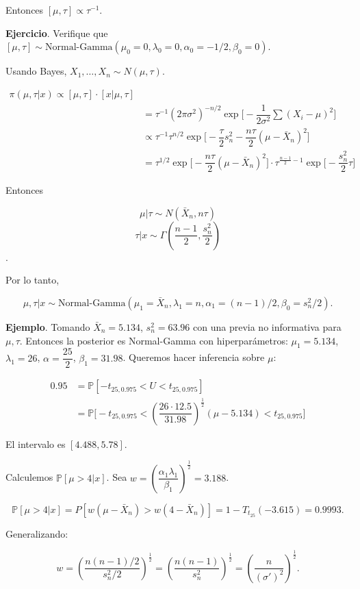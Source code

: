 \documentclass[
  12pt,
]{book}
\begin{document}
Entonces \([\mu,\tau]\propto\tau^{-1}\).

\textbf{Ejercicio}. Verifique que \([\mu,\tau]\sim \text{Normal-Gamma}(\mu_0=0,\lambda_0=0,\alpha_0=-1/2,\beta_0=0)\).

Usando Bayes, \(X_1,\dots,X_n \sim N(\mu, \tau)\).

\begin{align*}
 \pi(\mu,\tau|x) \propto [\mu,\tau]\cdot[x|\mu, \tau] \\ & = \tau^{-1} (2\pi\sigma^2)^{-n/2}\exp\bigg[-\dfrac 1{2\sigma^2}\sum (X_i-\mu)^2\bigg]\\
 & \propto \tau^{-1} \tau^{n/2} \exp\bigg[-\dfrac \tau 2 s_n^2 - \dfrac{n\tau}{2}(\mu-\bar X_n)^2\bigg]\\
 & = \tau^{1/2} \exp\bigg[-\dfrac{n\tau}2 (\mu-\bar X_n)^2\bigg]\cdot \tau^{\frac{n-1}{2}-1}\exp\bigg[-\dfrac{s_n^2}{2}\tau \bigg]
 \end{align*}

Entonces

\[\mu|\tau \sim N(\bar X_n,n\tau)\]
\[\tau|x\sim \Gamma\left(\dfrac{n-1}2, \dfrac{s_n^2}{2}\right)\].

Por lo tanto,

\[\mu,\tau|x \sim \text{Normal-Gamma}(\mu_1 = \bar X_n,\lambda_1=n,\alpha_1=(n-1)/2,\beta_0=s_n^2/2).\]

\textbf{Ejemplo}. Tomando \(\bar X_n = 5.134\), \(s_n^2 = 63.96\) con una previa no
informativa para \(\mu,\tau\). Entonces la posterior es Normal-Gamma con
hiperparámetros: \(\mu_1 = 5.134\), \(\lambda_1 = 26\), \(\alpha = \dfrac{25}2\),
\(\beta_1 = 31.98\). Queremos hacer inferencia sobre \(\mu\):

\begin{align*}
 0.95 & = \mathbb P[-t_{25,0.975}<U<t_{25,0.975}]\\
 & = \mathbb P\bigg[-t_{25,0.975}<\left(\dfrac{26\cdot 12.5}{31.98}\right)^{\frac 12}(\mu-5.134) <t_{25,0.975}\bigg]
 \end{align*}

El intervalo es \([4.488,5.78]\).

Calculemos \(\mathbb P[\mu>4|x]\). Sea \(w =\left(\dfrac{\alpha_1\lambda_1}{\beta_1}\right)^{\frac 12} = 3.188\).

\[  
\mathbb P[\mu>4|x] = P[w(\mu-\bar X_n)>w(4-\bar X_n)]=1-T_{t_{25}}(-3.615) =
0.9993.
\]

Generalizando:

\[ 
w = \left(\dfrac{n(n-1)/2}{s_n^2/2}\right)^{\frac 12} =
\left(\dfrac{n(n-1)}{s_n^2}\right)^{\frac 12} =
\left(\dfrac{n}{(\sigma')^2}\right)^{\frac 12}.
\]
\end{document}

